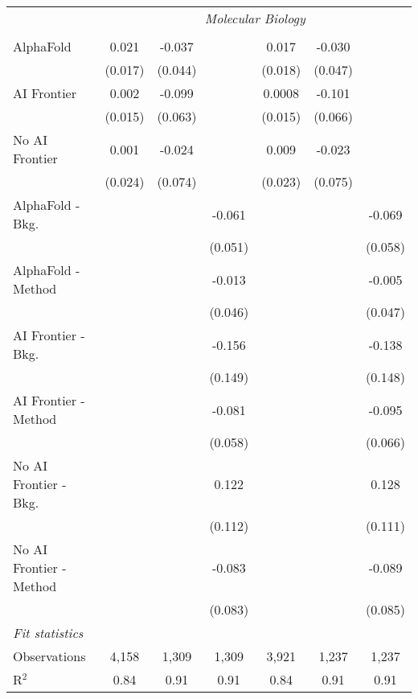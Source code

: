 \begin{tabular}{lcccccc}
 & \multicolumn{6}{c}{\textit{Molecular Biology}} \\ \\
   AlphaFold               & 0.021   & -0.037  &         & 0.017   & -0.030  &   \\   
                           & (0.017) & (0.044) &         & (0.018) & (0.047) &   \\   
   AI Frontier             & 0.002   & -0.099  &         & 0.0008  & -0.101  &   \\   
                           & (0.015) & (0.063) &         & (0.015) & (0.066) &   \\   
   No AI Frontier          & 0.001   & -0.024  &         & 0.009   & -0.023  &   \\   
                           & (0.024) & (0.074) &         & (0.023) & (0.075) &   \\   
   AlphaFold - Bkg.        &         &         & -0.061  &         &         & -0.069\\   
                           &         &         & (0.051) &         &         & (0.058)\\   
   AlphaFold - Method      &         &         & -0.013  &         &         & -0.005\\   
                           &         &         & (0.046) &         &         & (0.047)\\   
   AI Frontier - Bkg.      &         &         & -0.156  &         &         & -0.138\\   
                           &         &         & (0.149) &         &         & (0.148)\\   
   AI Frontier - Method    &         &         & -0.081  &         &         & -0.095\\   
                           &         &         & (0.058) &         &         & (0.066)\\   
   No AI Frontier - Bkg.   &         &         & 0.122   &         &         & 0.128\\   
                           &         &         & (0.112) &         &         & (0.111)\\   
   No AI Frontier - Method &         &         & -0.083  &         &         & -0.089\\   
                           &         &         & (0.083) &         &         & (0.085)\\   
   \midrule
   \emph{Fit statistics}\\
   Observations            & 4,158   & 1,309   & 1,309   & 3,921   & 1,237   & 1,237\\  
   R$^2$                   & 0.84    & 0.91    & 0.91    & 0.84    & 0.91    & 0.91\\  
   

\end{tabular}
